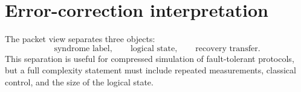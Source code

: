 \section{Error-correction interpretation}
The packet view separates three objects:
\[
\text{syndrome label},
\qquad
\text{logical state},
\qquad
\text{recovery transfer}.
\]
This separation is useful for compressed simulation of fault-tolerant protocols, but a full complexity statement must include repeated measurements, classical control, and the size of the logical state.
